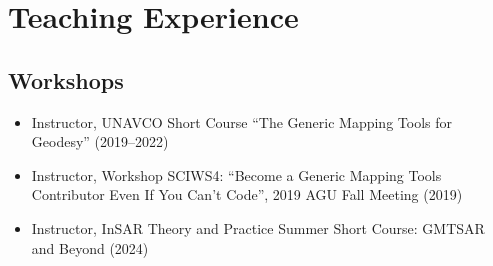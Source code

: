 \section{Teaching Experience}

\subsection{Workshops}
\begin{itemize}
\item Instructor, UNAVCO Short Course ``The Generic Mapping Tools for Geodesy'' (2019--2022)
\item Instructor, Workshop SCIWS4: ``Become a Generic Mapping Tools Contributor Even If You Can't Code'', 2019 AGU Fall Meeting (2019)
\item Instructor, InSAR Theory and Practice Summer Short Course: GMTSAR and Beyond (2024)
\end{itemize}
